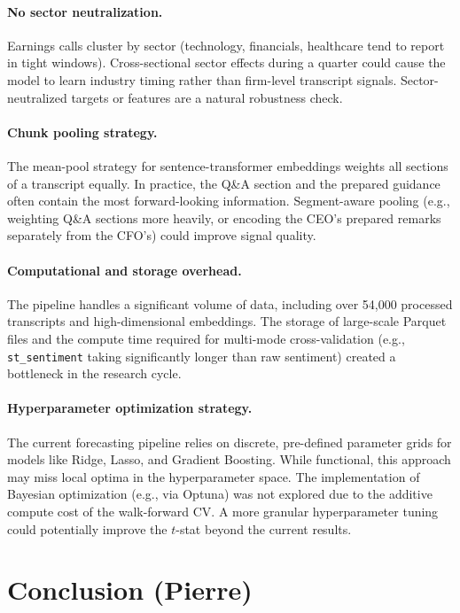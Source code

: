 \documentclass{article}
\begin{document}
\paragraph{No sector neutralization.}
Earnings calls cluster by sector (technology, financials, healthcare tend to report in tight windows). Cross-sectional sector effects during a quarter could cause the model to learn industry timing rather than firm-level transcript signals. Sector-neutralized targets or features are a natural robustness check.

\paragraph{Chunk pooling strategy.}
The mean-pool strategy for sentence-transformer embeddings weights all sections of a transcript equally. In practice, the Q\&A section and the prepared guidance often contain the most forward-looking information. Segment-aware pooling (e.g., weighting Q\&A sections more heavily, or encoding the CEO's prepared remarks separately from the CFO's) could improve signal quality.

\paragraph{Computational and storage overhead.}
The pipeline handles a significant volume of data, including over 54,000 processed transcripts and high-dimensional embeddings. The storage of large-scale Parquet files and the compute time required for multi-mode cross-validation (e.g., \texttt{st\_sentiment} taking significantly longer than raw sentiment) created a bottleneck in the research cycle.

\paragraph{Hyperparameter optimization strategy.}
The current forecasting pipeline relies on discrete, pre-defined parameter grids for models like Ridge, Lasso, and Gradient Boosting. While functional, this approach may miss local optima in the hyperparameter space. The implementation of Bayesian optimization (e.g., via Optuna) was not explored due to the additive compute cost of the walk-forward CV. A more granular hyperparameter tuning could potentially improve the $t$-stat beyond the current results.


\section{Conclusion (Pierre)}
\end{document}
